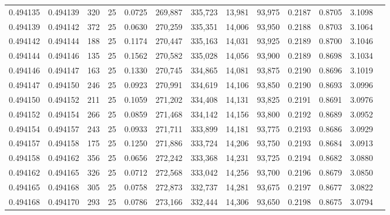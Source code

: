 \begin{tabular}{rrrrrrrrrrrrr}
0.494135 & 0.494139 &   320 &  25 &                                     0.0725 & 269,887 & 335,723 &  13,981 &  93,975 & 0.2187 & 0.8705 & 3.1098 \\
0.494139 & 0.494142 &   372 &  25 &                                     0.0630 & 270,259 & 335,351 &  14,006 &  93,950 & 0.2188 & 0.8703 & 3.1064 \\
0.494142 & 0.494144 &   188 &  25 &                                     0.1174 & 270,447 & 335,163 &  14,031 &  93,925 & 0.2189 & 0.8700 & 3.1046 \\
0.494144 & 0.494146 &   135 &  25 &                                     0.1562 & 270,582 & 335,028 &  14,056 &  93,900 & 0.2189 & 0.8698 & 3.1034 \\
0.494146 & 0.494147 &   163 &  25 &                                     0.1330 & 270,745 & 334,865 &  14,081 &  93,875 & 0.2190 & 0.8696 & 3.1019 \\
0.494147 & 0.494150 &   246 &  25 &                                     0.0923 & 270,991 & 334,619 &  14,106 &  93,850 & 0.2190 & 0.8693 & 3.0996 \\
0.494150 & 0.494152 &   211 &  25 &                                     0.1059 & 271,202 & 334,408 &  14,131 &  93,825 & 0.2191 & 0.8691 & 3.0976 \\
0.494152 & 0.494154 &   266 &  25 &                                     0.0859 & 271,468 & 334,142 &  14,156 &  93,800 & 0.2192 & 0.8689 & 3.0952 \\
0.494154 & 0.494157 &   243 &  25 &                                     0.0933 & 271,711 & 333,899 &  14,181 &  93,775 & 0.2193 & 0.8686 & 3.0929 \\
0.494157 & 0.494158 &   175 &  25 &                                     0.1250 & 271,886 & 333,724 &  14,206 &  93,750 & 0.2193 & 0.8684 & 3.0913 \\
0.494158 & 0.494162 &   356 &  25 &                                     0.0656 & 272,242 & 333,368 &  14,231 &  93,725 & 0.2194 & 0.8682 & 3.0880 \\
0.494162 & 0.494165 &   326 &  25 &                                     0.0712 & 272,568 & 333,042 &  14,256 &  93,700 & 0.2196 & 0.8679 & 3.0850 \\
0.494165 & 0.494168 &   305 &  25 &                                     0.0758 & 272,873 & 332,737 &  14,281 &  93,675 & 0.2197 & 0.8677 & 3.0822 \\
0.494168 & 0.494170 &   293 &  25 &                                     0.0786 & 273,166 & 332,444 &  14,306 &  93,650 & 0.2198 & 0.8675 & 3.0794 \\

\end{tabular}
